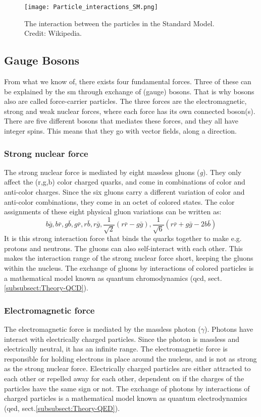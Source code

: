 \documentclass[a4paper, american, 12pt]{report}
\begin{document}
	\begin{figure}[htb!]
		\centering\texttt{[image: Particle\_interactions\_SM.png]}
		\caption[Particle interactions in the SM.]{The interaction between the particles in the Standard Model. Credit: Wikipedia.\label{fig:interactions_SM}}
	\end{figure} 


	\subsection{Gauge Bosons}
	\label{subsect:Theory-Bosons}
	From what we know of, there exists four fundamental forces. Three of these can be explained by the \acrshort{sm} through exchange of (gauge) bosons. That is why bosons also are called force-carrier particles. The three forces are the electromagnetic, strong and weak nuclear forces, where each force has its own connected boson(s). There are five different bosons that mediates these forces, and they all have integer spins. This means that they go with vector fields, along a direction.
	
		
	\subsubsection{Strong nuclear force} 
	\label{subsubsect:Theory-Strong_Force}
	The strong nuclear force is mediated by eight massless gluons (\textit{g}). They only affect the (r,g,b) color charged quarks, and come in combinations of color and anti-color charges. Since the six gluons carry a different variation of color and anti-color combinations, they come in an octet of colored states. The color assignments of these eight physical gluon variations can be written as:
	\[b\bar{g}, b\bar{r}, g\bar{b}, g\bar{r}, r\bar{b}, r\bar{g},\frac{1}{\sqrt{2}}(r\bar{r}-g\bar{g}), \frac{1}{\sqrt{6}}(r\bar{r}+g\bar{g}-2b\bar{b})\] 
	It is this strong interaction force that binds the quarks together to make e.g. protons and neutrons. The gluons can also self-interact with each other. This makes the interaction range of the strong nuclear force short, keeping the gluons within the nucleus. The exchange of gluons by interactions of colored particles is a mathematical model known as quantum chromodynamics (\acrshort{qcd}, sect.\ref{subsubsect:Theory-QCD}).
	
	
	\subsubsection{Electromagnetic force}
	\label{subsubsect:Theory-EM_Force}
	The electromagnetic force is mediated by the massless photon ($\gamma$). Photons have interact with electrically charged particles. Since the photon is massless and electrically neutral, it has an infinite range. The electromagnetic force is responsible for holding electrons in place around the nucleus, and is not as strong as the strong nuclear force. Electrically charged particles are either attracted to each other or repelled away for each other, dependent on if the charges of the particles have the same sign or not. The exchange of photons by interactions of charged particles is a mathematical model known as quantum electrodynamics (\acrshort{qed}, sect.\ref{subsubsect:Theory-QED}).
	
\end{document}
